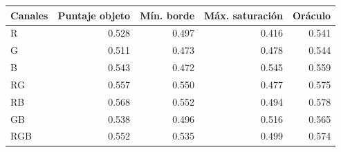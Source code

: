 \footnotesize
\begin{tabular}{lrrrr}
\toprule
Canales & Puntaje objeto & Mín. borde & Máx. saturación & Oráculo \\
\midrule
R & 0.528 & 0.497 & 0.416 & 0.541 \\
G & 0.511 & 0.473 & 0.478 & 0.544 \\
B & 0.543 & 0.472 & 0.545 & 0.559 \\
RG & 0.557 & 0.550 & 0.477 & 0.575 \\
RB & 0.568 & 0.552 & 0.494 & 0.578 \\
GB & 0.538 & 0.496 & 0.516 & 0.565 \\
RGB & 0.552 & 0.535 & 0.499 & 0.574 \\
\bottomrule
\end{tabular}
